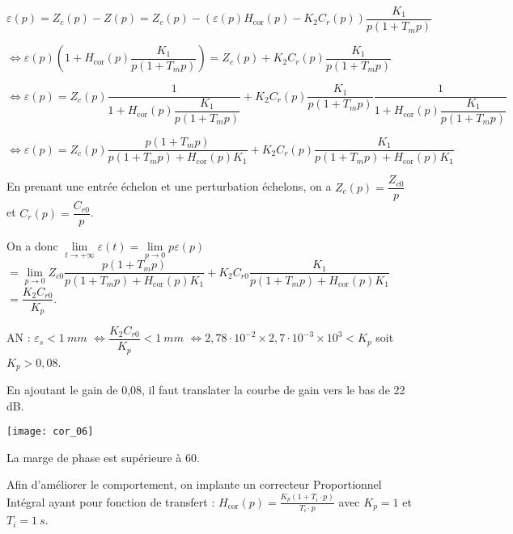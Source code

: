 $
\varepsilon(p)=Z_c(p)-Z(p) = Z_c(p)- \left(\varepsilon(p) H_{\text{cor}}(p)-   K_2 C_r(p)\right) \dfrac{K_1}{p\left(1+T_m p\right)}$

$\Leftrightarrow \varepsilon(p)\left(1 +  H_{\text{cor}}(p)\dfrac{K_1}{p\left(1+T_m p\right)} \right) 
= Z_c(p) + K_2 C_r(p) \dfrac{K_1}{p\left(1+T_m p\right)}$

$\Leftrightarrow \varepsilon(p)  = 
Z_c(p)\dfrac{1}{1 +  H_{\text{cor}}(p)\dfrac{K_1}{p\left(1+T_m p\right)}} 
+   K_2 C_r(p) \dfrac{K_1}{p\left(1+T_m p\right)} \dfrac{1}{1 +  H_{\text{cor}}(p)\dfrac{K_1}{p\left(1+T_m p\right)}}$

$\Leftrightarrow \varepsilon(p)  = 
Z_c(p)\dfrac{{p\left(1+T_m p\right)}}{{p\left(1+T_m p\right)} +  H_{\text{cor}}(p){K_1}} 
+  K_2 C_r(p)  \dfrac{K_1}{p\left(1+T_m p\right) +  H_{\text{cor}}(p){K_1}}$


En prenant une entrée échelon et une perturbation échelons, on a $Z_c(p) = \dfrac{Z_{c0}}{p}$ et 
$C_{r}(p) = \dfrac{C_{r0}}{p}$.

On a donc $\lim\limits_{t\to +\infty} \varepsilon(t)=\lim\limits_{p\to 0} p\varepsilon(p)$
$=  \lim\limits_{p\to 0} Z_{c0}\dfrac{{p\left(1+T_m p\right)}}{{p\left(1+T_m p\right)} +  H_{\text{cor}}(p){K_1}} 
+   K_2 C_{r0}  \dfrac{K_1}{p\left(1+T_m p\right) +  H_{\text{cor}}(p){K_1}} $ $ =   \dfrac{K_2 C_{r0}}{ K_p}$.

AN : $\varepsilon_s < \SI{1}{mm}$
$\Leftrightarrow \dfrac{K_2 C_{r0}}{ K_p} < \SI{1}{mm}$  
$\Leftrightarrow 
2,78 \cdot 10^{-2} \times 2,7 \cdot 10^{-3} \times 10^3<  K_p$  soit $K_p >0,08$.
\else
\fi


\ifprof
En ajoutant le gain de 0,08, il faut translater la courbe de gain vers le bas de 22 dB.

\begin{center}
\texttt{[image: cor\_06]}
\end{center}

La marge de phase est supérieure à 60\degres.
\else
\fi

Afin d'améliorer le comportement, on implante un correcteur Proportionnel Intégral ayant pour fonction de transfert : $H_{\text{cor}}(p)=\frac{K_p\left(1+T_i\cdot p\right)}{T_i\cdot p}$ avec $K_p=1$ et $T_i = \SI{1}{s}$.

